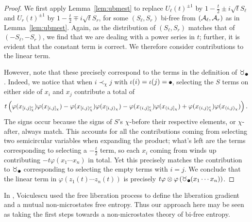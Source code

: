 \begin{proof}
	We first apply Lemma~\ref{lem:ubmest} to replace $U_\ell(t)^{\pm1}$ by $1-\frac{t}{2} \pm i\sqrt{t}S_\ell$ and $U_r(t)^{\pm1}$ by $1-\frac{t}{2}\mp i\sqrt{t}S_r$, for some $(S_\ell, S_r)$ bi-free from $(\mathcal{A}_\ell, \mathcal{A}_r)$ as in Lemma~\ref{lem:ubmest}.
	Again, as the distribution of $(S_\ell, S_r)$ matches that of $(-S_\ell, -S_r)$, we find that we are dealing with a power series in $t$; further, it is evident that the constant term is correct.
	We therefore consider contributions to the linear term.

	However, note that these precisely correspond to the terms in the definition of $\taur_{\makeaball{1}}$.
	Indeed, we notice that when $i \prec_\chi j$ with $\e(i) = \e(j) = \makeaball{1}$, selecting the $S$ terms on either side of $x_i$ and $x_j$ contribute a total of
	$$t\left(\varphi(x_{[i,j]_\chi^c})\varphi(x_{[i,j]_\chi}) - \varphi(x_{[i,j)_\chi^c})\varphi(x_{[i,j)_\chi})
	- \varphi(x_{(i,j]_\chi^c})\varphi(x_{(i,j]_\chi}) + \varphi(x_{(i,j)_\chi^c})\varphi(x_{(i,j)_\chi})\right).$$
	The signs occur because the signs of $S$'s $\chi$-before their respective elements, or $\chi$-after, always match.
	This accounts for all the contributions coming from selecting two semicircular variables when expanding the product; what's left are the terms corresponding to selecting a $-\frac{t}{2}$ term, so each $x_i$ coming from  winds up contributing $-t\varphi(x_1\cdots x_n)$ in total.
	Yet this precisely matches the contribution to $\taur_{\makeaball{1}}$ corresponding to selecting the empty terms with $i = j$.
	We conclude that the linear term in $\varphi(z_1(t)\cdots z_n(t))$ is precisely $t\varphi\otimes\varphi\paren{\taur_{\makeaball{1}}(x_1\cdots x_n)}$.
\end{proof}

In \cite{Voiculescu1999101}, Voiculescu used the free liberation process to define the liberation gradient and a mutual non-microstates free entropy.
Thus our approach here may be seen as taking the first steps towards a non-microstates theory of bi-free entropy.
\renewcommand{\e}{\iota}
